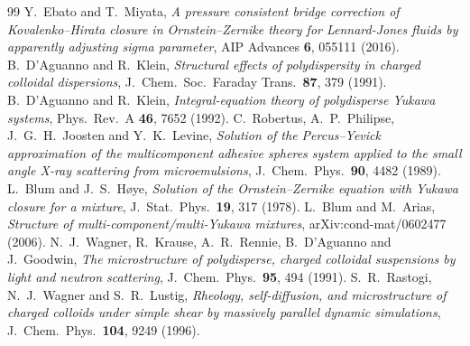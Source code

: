 \documentclass[11pt,a4paper]{article}
\begin{document}
\begin{thebibliography}{99}
Y.~Ebato and T.~Miyata,
\emph{A pressure consistent bridge correction of Kovalenko--Hirata closure
in Ornstein--Zernike theory for Lennard-Jones fluids by apparently
adjusting sigma parameter},
AIP Advances \textbf{6}, 055111 (2016).
B.~D'Aguanno and R.~Klein,
\emph{Structural effects of polydispersity in charged colloidal dispersions},
J.~Chem.\ Soc.\ Faraday Trans.\ \textbf{87}, 379 (1991).
B.~D'Aguanno and R.~Klein,
\emph{Integral-equation theory of polydisperse Yukawa systems},
Phys.\ Rev.\ A \textbf{46}, 7652 (1992).
C.~Robertus, A.~P.~Philipse, J.~G.~H.~Joosten and Y.~K.~Levine,
\emph{Solution of the Percus--Yevick approximation of the multicomponent
adhesive spheres system applied to the small angle X-ray scattering from
microemulsions}, J.~Chem.\ Phys.\ \textbf{90}, 4482 (1989).
L.~Blum and J.~S.~H\o ye,
\emph{Solution of the Ornstein--Zernike equation with Yukawa closure for a
mixture}, J.~Stat.\ Phys.\ \textbf{19}, 317 (1978).
L.~Blum and M.~Arias,
\emph{Structure of multi-component/multi-Yukawa mixtures},
arXiv:cond-mat/0602477 (2006).
N.~J.~Wagner, R.~Krause, A.~R.~Rennie, B.~D'Aguanno and J.~Goodwin,
\emph{The microstructure of polydisperse, charged colloidal suspensions by
light and neutron scattering}, J.~Chem.\ Phys.\ \textbf{95}, 494 (1991).
S.~R.~Rastogi, N.~J.~Wagner and S.~R.~Lustig,
\emph{Rheology, self-diffusion, and microstructure of charged colloids under
simple shear by massively parallel dynamic simulations},
J.~Chem.\ Phys.\ \textbf{104}, 9249 (1996).
\end{thebibliography}
\end{document}
